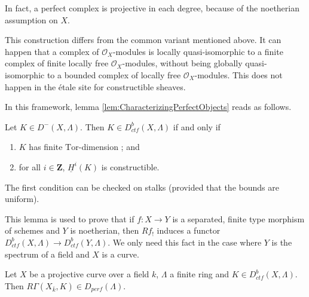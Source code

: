 \begin{remark}
In fact, a perfect complex is projective in each degree, because of the 
noetherian assumption on $X$. 
\end{remark}

\begin{remark}
This construction differs from the common variant mentioned above. It can 
happen that a complex of $\mathcal{O}_X$-modules is locally quasi-isomorphic to 
a finite complex of finite locally free $\mathcal{O}_X$-modules, without being 
globally quasi-isomorphic to a bounded complex of locally free 
$\mathcal{O}_X$-modules. This does not happen in the \'etale site for 
constructible sheaves.
\end{remark}

In this framework, lemma \ref{lem:CharacterizingPerfectObjects} reads as 
follows.

\begin{lemma} 
Let $K\in D^-(X, \Lambda)$. Then $K\in D_{ctf}^b(X, \Lambda)$ if and only if 
\begin{enumerate}
\item
$K$ has finite $\text{Tor}$-dimension ; and
\item
for all $i \in \mathbf{Z}$, $\underline{H}^i(K)$ is constructible.
\end{enumerate} 
\end{lemma}

The first condition can be checked on stalks (provided that the bounds are 
uniform).

\begin{remark} 
This lemma is used to prove that if $f: X\to Y$ is a separated, finite type 
morphism of schemes and $Y$ is noetherian, then $Rf_!$ induces a functor 
$D_{ctf}^b(X, \Lambda) \to D_{ctf}^b (Y, \Lambda)$. We only need this fact in 
the case where $Y$ is the spectrum of a field and $X$ is a curve. 
\end{remark}

\begin{proposition}
Let $X$ be a projective curve over a field $k$, $\Lambda$ a finite ring and 
$K\in D_{ctf}^b (X, \Lambda)$. Then $R\Gamma(X_{\bar k}, K)\in 
D_{perf}(\Lambda)$.
\end{proposition}
	
